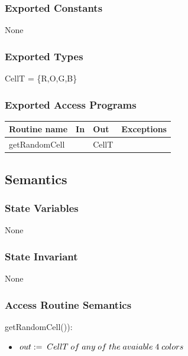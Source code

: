\documentclass[12pt]{article}
\begin{document}
\subsubsection* {Exported Constants}

None

\subsubsection* {Exported Types}

CellT = \{R,O,G,B\}\\ 

\subsubsection* {Exported Access Programs}

\begin{tabular}{| l | l | l | l |}
\hline
\textbf{Routine name} & \textbf{In} & \textbf{Out} & \textbf{Exceptions}\\
\hline
getRandomCell & & CellT & \\
\hline
\end{tabular}

\subsection* {Semantics}

\subsubsection* {State Variables}

None

\subsubsection* {State Invariant}

None

\subsubsection* {Access Routine Semantics}

getRandomCell()):
\begin{itemize}
\item $out:= \thickspace CellT \thickspace of \thickspace any \thickspace of \thickspace the \thickspace avaiable \thickspace 4 \thickspace colors $
\end{itemize}
\end{document}
